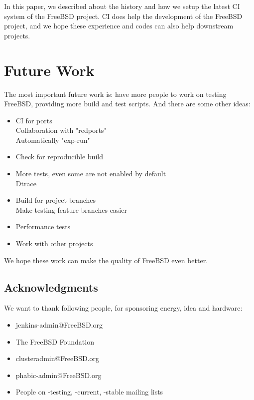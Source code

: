 \documentclass[a4paper,twocolumn,10pt]{article}
\begin{document}
In this paper, we described about the history and how we setup the latest CI
system of the FreeBSD project.  CI does help the development of the FreeBSD
project, and we hope these experience and codes can also help downstream
projects.

\section{Future Work}

The most important future work is: have more people to work on testing FreeBSD,
providing more build and test scripts. And there are some other ideas:

\begin{itemize}
\item CI for ports\\
  Collaboration with "redports"\\
  Automatically "exp-run"
\item Check for reproducible build
\item More tests, even some are not enabled by default\\
Dtrace
\item Build for project branches\\
Make testing feature branches easier
\item Performance tests
\item Work with other projects
\end{itemize}

We hope these work can make the quality of FreeBSD even better.

\subsection*{Acknowledgments}

We want to thank following people, for sponsoring energy, idea and hardware:

\begin{itemize}
\item jenkins-admin@FreeBSD.org
\item The FreeBSD Foundation
\item clusteradmin@FreeBSD.org
\item phabic-admin@FreeBSD.org
\item People on -testing, -current, -stable mailing lists
\end{itemize}

{\footnotesize 
}
\end{document}
